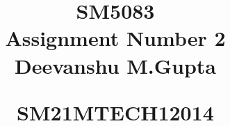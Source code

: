 \documentclass[journal,12pt,twocolumn]{IEEEtran}
\begin{document}
%


\newtheorem{theorem}{Theorem}[section]
\newtheorem{problem}{Problem}
\newtheorem{proposition}{Proposition}[section]
\newtheorem{lemma}{Lemma}[section]
\newtheorem{corollary}[theorem]{Corollary}
\newtheorem{example}{Example}[section]
\newtheorem{definition}[problem]{Definition}
\newcommand{\BEQA}{\begin{eqnarray}}
\newcommand{\EEQA}{\end{eqnarray}}
\newcommand{\define}{\stackrel{\triangle}{=}}




\providecommand{\mbf}{\mathbf}
\providecommand{\pr}[1]{\ensuremath{\Pr\left(#1\right)}}
\providecommand{\qfunc}[1]{\ensuremath{Q\left(#1\right)}}
\providecommand{\sbrak}[1]{\ensuremath{{}\left[#1\right]}}
\providecommand{\lsbrak}[1]{\ensuremath{{}\left[#1\right.}}
\providecommand{\rsbrak}[1]{\ensuremath{{}\left.#1\right]}}
\providecommand{\brak}[1]{\ensuremath{\left(#1\right)}}
\providecommand{\lbrak}[1]{\ensuremath{\left(#1\right.}}
\providecommand{\rbrak}[1]{\ensuremath{\left.#1\right)}}
\providecommand{\cbrak}[1]{\ensuremath{\left\{#1\right\}}}
\providecommand{\lcbrak}[1]{\ensuremath{\left\{#1\right.}}
\providecommand{\rcbrak}[1]{\ensuremath{\left.#1\right\}}}
\theoremstyle{remark}
\newtheorem{rem}{Remark}
\newcommand{\sgn}{\mathop{\mathrm{sgn}}}
\providecommand{\abs}[1]{\lvert#1\rvert}
\providecommand{\res}[1]{\Res\displaylimits_{#1}} 
\providecommand{\norm}[1]{\lVert#1\rVert}
\providecommand{\mtx}[1]{\mathbf{#1}}
\providecommand{\fourier}{\overset{\mathcal{F}}{ \rightleftharpoons}}
\providecommand{\system}{\overset{\mathcal{H}}{ \longleftrightarrow}}
\newcommand{\solution}{\noindent \textbf{Solution: }}
\newcommand{\cosec}{\,\text{cosec}\,}
\providecommand{\dec}[2]{\ensuremath{\overset{#1}{\underset{#2}{\gtrless}}}}
\newcommand{\myvec}[1]{\ensuremath{\begin{pmatrix}#1\end{pmatrix}}}
\newcommand{\cmyvec}[1]{\ensuremath{\begin{pmatrix*}[c]#1\end{pmatrix*}}}
\newcommand{\mydet}[1]{\ensuremath{\begin{vmatrix}#1\end{vmatrix}}}
\newcommand{\proj}[2]{\textbf{proj}_{\vec{#1}}\vec{#2}}
\newcommand{\RNum}[1]{\uppercase\expandafter{\romannumeral #1\relax}}
\let\StandardTheFigure\thefigure
\let\vec\mathbf


\title{
\LARGE SM5083\\
    \LARGE Assignment Number 2 \\[0.5em]
    
    \large Deevanshu M.Gupta\par
    \large   SM21MTECH12014  \par
}
\maketitle
\end{document}
